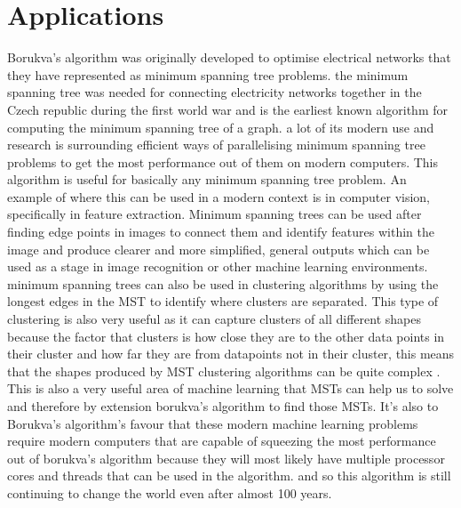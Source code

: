 \documentclass{report}
\begin{document}
\section{Applications}
Borukva's algorithm was originally developed to optimise electrical networks that they have represented as minimum spanning tree problems. the minimum spanning tree was needed for connecting electricity networks together in the Czech republic during the first world war and is the earliest known algorithm for computing the minimum spanning tree of a graph. a lot of its modern use and research is surrounding efficient ways of parallelising minimum spanning tree problems to get the most performance out of them on modern computers.
This algorithm is useful for basically any minimum spanning tree problem. An example of where this can be used in a modern context is in computer vision, specifically in feature extraction. Minimum spanning trees can be used after finding edge points in images to connect them and identify features within the image and produce clearer and more simplified, general outputs \cite{SUK1984400} which can be used as a stage in image recognition or other machine learning environments.
minimum spanning trees can also be used in clustering algorithms by using the longest edges in the MST to identify where clusters are separated. This type of clustering is also very useful as it can capture clusters of all different shapes because the factor that clusters is how close they are to the other data points in their cluster and how far they are from datapoints not in their cluster, this means that the shapes produced by MST clustering algorithms can be quite complex \cite{5397966}. This is also a very useful area of machine learning that MSTs can help us to solve and therefore by extension borukva's algorithm to find those MSTs. It's also to Borukva's algorithm's favour that these modern machine learning problems require modern computers that are capable of squeezing the most performance out of borukva's algorithm because they will most likely have multiple processor cores and threads that can be used in the algorithm. and so this algorithm is still continuing to change the world even after almost 100 years.




\end{document}
